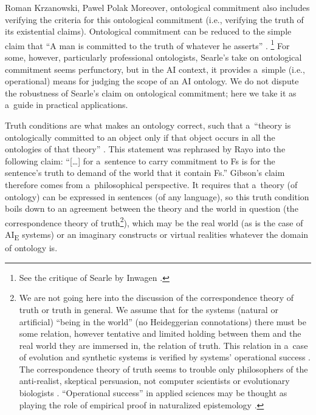 \begin{artengenv2auth}{Roman Krzanowski, Pawel Polak}
Moreover, ontological commitment also includes verifying the criteria for this ontological commitment (i.e., verifying the truth of its existential claims). Ontological commitment can be reduced to the simple claim that ``A man is committed to the truth of whatever he asserts''
\parencite[][p.112]{searle_speech_1969}.%
\footnote{See the critique of Searle by Inwagen
\parencite*[][]{lepore_searle_1991}.%
} For some, however, particularly professional ontologists, Searle's take on ontological commitment seems perfunctory, but in the AI context, it provides a~simple (i.e., operational) means for judging the scope of an AI ontology. We do not dispute the robustness of Searle's claim on ontological commitment; here we take it as a~guide in practical applications.

Truth conditions are what makes an ontology correct, such that a~``theory is ontologically committed to an object only if that object occurs in all the ontologies of that theory''
\parencite[][p.631]{gibson_ontological_2009}. %
 This statement was rephrased by Rayo 
\parencite*[][]{rayo_ontological_2007} %
 into the following claim: ``[…] for a~sentence to carry commitment to Fs is for the sentence's truth to demand of the world that it contain Fs.'' Gibson's claim therefore comes from a~philosophical perspective. It requires that a~theory (of ontology) can be expressed in sentences (of any language), so this truth condition boils down to an agreement between the theory and the world in question (the correspondence theory of truth\footnote{We are not going here into the discussion of the correspondence theory of truth or truth in general. We assume that for the systems (natural or artificial) ``being in the world'' (no Heideggerian connotations) there must be some relation, however tentative and limited holding between them and the real world they are immersed in, the relation of truth. This relation in a~case of evolution and synthetic systems is verified by systems' operational success 
\parencite[see for example the discussion of truth relation in][]{bird_thomas_2000}. %
 The correspondence theory of truth seems to trouble only philosophers of the anti-realist, skeptical persuasion, not computer scientists or evolutionary biologists 
\parencite[][]{bird_thomas_2000}. %
 ``Operational success'' in applied sciences may be thought as playing the role of empirical proof in naturalized epistemology 
\parencite[][p.263]{bird_thomas_2000}. %
 }), which may be the real world (as is the case of AI\textsubscript{E} systems) or an imaginary constructs or virtual realities whatever the domain of ontology is.


\end{artengenv2auth}

